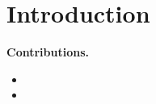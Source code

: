 \section{Introduction}



\noindent\textbf{Contributions.}
\begin{itemize}
  \item %
  \item %
\end{itemize}

